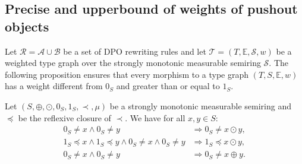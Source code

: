 \begin{example}
\end{example}









\subsection{Precise and upperbound of weights of pushout objects}
Let \( \mathcal{R} = \mathcal{A} \cup \mathcal{B} \) be a set of DPO rewriting rules and let \(\mathcal{T} = (T, \mathbb{E}, \mathcal{S}, w)\) be a weighted type graph over the strongly monotonic measurable semiring $\mathcal{S}$.
The following proposition ensures that every morphism to a type graph $(T,S,\mathbb{E}, w)$ has a weight different from $0_S$ and greater than or equal to $1_S$.
\begin{proposition}  
    \label{prop_endrullis_2d7}
    Let $(S, \oplus, \odot, 0_S, 1_S, \prec, \mu)$ be a strongly monotonic measurable semiring and $\preceq$ be the reflexive closure of $\prec$. We have for all $x,y\in S$:
    \begin{align*}
        0_S \neq x \land 0_S \neq y 
        &\Rightarrow 0_S \neq x \odot y,
        \tag{S10} \label{eq:prop_neq0_mul_neq0}  
        \\
        1_S \preceq x \land 1_S \preceq y \land 0_S \neq x \land 0_S \neq y  
        &\Rightarrow
         1_S \preceq x \odot y,
         \tag{S11} \label{eq:prop_neg0_ge1_mul_ge1}  
         \\
         0_S \neq x \land 0_S \neq y   
         &\Rightarrow 0_S \neq x \oplus y.
         \tag{S12} \label{eq:prop_neq0_plus_neq0}  
    \end{align*}
\end{proposition}


